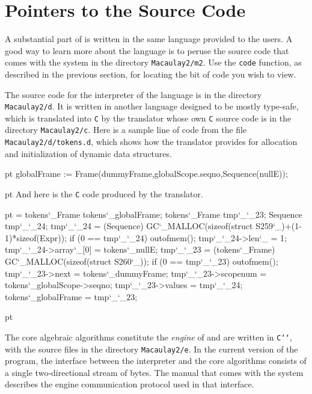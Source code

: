 \section{Pointers to the Source Code}

A substantial part of \Mtwo is written in the same language provided to the
users.  A good way to learn more about the \Mtwo language is to peruse the
source code that comes with the system in the directory {\tt Macaulay2/m2}.
Use the {\tt code} function, as described in the previous section, for
locating the bit of code you wish to view.

The source code for the interpreter of the \Mtwo language is in the directory
{\tt Macaulay2/d}.  It is written in another language designed to be mostly
type-safe, which is translated into {\tt C} by the translator whose own
{\tt C} source code is in the directory {\tt Macaulay2/c}.  Here is a
sample line of code from the file {\tt Macaulay2/d/tokens.d}, which shows how
the translator provides for allocation and initialization of dynamic data
structures.
\par
{} pt
\begingroup
\tteight
\baselineskip=8pt
\lineskip=0pt
\obeyspaces
globalFrame := Frame(dummyFrame,globalScope.seqno,Sequence(nullE));\leavevmode\hss\endgraf
\endgroup
{}
\par
{} pt
\noindent
And here is the {\tt C} code produced by the translator.
\par
{} pt
\begingroup
\tteight
\baselineskip=\outputBaseLineSkip
\lineskip=0pt
\obeyspaces
\obeylines
tokens\char`\_Frame tokens\char`\_globalFrame;
tokens\char`\_Frame tmp\char`\_\char`\_23;
Sequence tmp\char`\_\char`\_24;
tmp\char`\_\char`\_24 = (Sequence) GC\char`\_MALLOC(sizeof(struct S259\char`\_)+(1-1)*sizeof(Expr));
if (0 == tmp\char`\_\char`\_24) outofmem();
tmp\char`\_\char`\_24->len\char`\_ = 1;
tmp\char`\_\char`\_24->array\char`\_[0] = tokens\char`\_nullE;
tmp\char`\_\char`\_23 = (tokens\char`\_Frame) GC\char`\_MALLOC(sizeof(struct S260\char`\_));
if (0 == tmp\char`\_\char`\_23) outofmem();
tmp\char`\_\char`\_23->next = tokens\char`\_dummyFrame;
tmp\char`\_\char`\_23->scopenum = tokens\char`\_globalScope->seqno;
tmp\char`\_\char`\_23->values = tmp\char`\_\char`\_24;
tokens\char`\_globalFrame = tmp\char`\_\char`\_23;
\endgroup
{}
\par
{} pt

The core algebraic algorithms constitute the {\sl engine} of \Mtwo and are
written in {\tt C\char`\+\char`\+}, with the source files in the directory
{\tt Macaulay2/e}.  In the current version of the program, the interface
between the interpreter and the core algorithms consists of a single
two-directional stream of bytes.  The manual that comes with the system
\cite{M2} describes the engine communication protocol used in that
interface.

